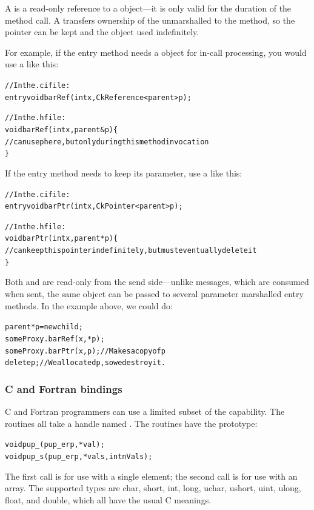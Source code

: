 A  is a read-only reference to a  object---it
is only valid for the duration of the method call.  A 
transfers ownership of the unmarshalled  to the method, so the 
pointer can be kept and the object used indefinitely.  

For example, if the entry method  needs a  
object for in-call processing, you would use a  like this:

\begin{alltt}
// In the .ci file:
    entry void barRef(int x,CkReference<parent> p);

// In the .h file:
    void barRef(int x,parent &p) \{
      // can use p here, but only during this method invocation
    \}
\end{alltt}

If the entry method needs to keep its parameter, use a  like this:
\begin{alltt}
// In the .ci file:
    entry void barPtr(int x,CkPointer<parent> p);

// In the .h file:
    void barPtr(int x,parent *p) \{
      // can keep this pointer indefinitely, but must eventually delete it
    \}
\end{alltt}

Both  and  are read-only from the send 
side---unlike messages, which are consumed when sent, the same object 
can be passed to several parameter marshalled entry methods.
In the example above, we could do:

\begin{alltt}
   parent *p=new child;
   someProxy.barRef(x,*p);
   someProxy.barPtr(x,p); // Makes a copy of p
   delete p; // We allocated p, so we destroy it.
\end{alltt}


\subsubsection{C and Fortran bindings}
C and Fortran programmers can use a limited subset of the
 capability.  The routines all take a 
handle named .  The routines 
have the prototype:
\begin{alltt}
void pup\_(pup\_er p, *val);
void pup\_s(pup\_er p, *vals,int nVals);
\end{alltt}
The first call is for use with a single element;
the second call is for use with an array.
The supported types are char, short, int, long,
uchar, ushort, uint, ulong, float, and double,
which all have the usual C meanings.

